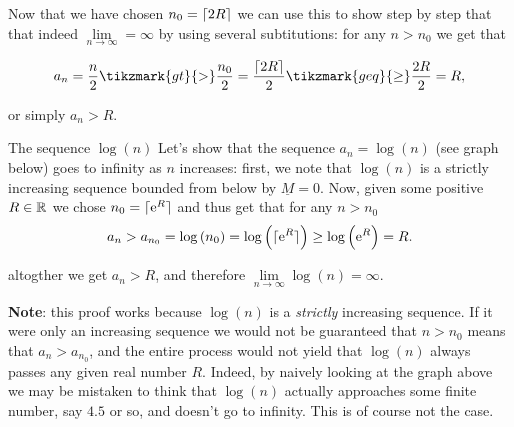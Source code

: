 Now that we have chosen $n_{0}=\lceil 2R \rceil$ we can use this to show step by step that that indeed $\lim\limits_{n\to\infty}=\infty$ by using several subtitutions: for any $n>n_{0}$ we get that

\vspace{1em}
\[
	a_{n} = \frac{n}{2} \tikzmark{gt}{>} \frac{n_{0}}{2} = \frac{\ceil{2R}}{2} \tikzmark{geq}{\geq}\frac{2R}{2} = R,
\]

\vspace{2em}
or simply $a_{n}>R$.

\vspace{2em}
\begin{example}{The sequence $\log(n)$}{}
	Let's show that the sequence $a_{n}=\log(n)$ (see graph below) goes to infinity as $n$ increases: first, we note that $\log(n)$ is a strictly increasing sequence bounded from below by $\underline{M}=0$. Now, given some positive $R\in\mathbb{R}^{}$ we chose $n_{0}=\lceil \mathrm{e}^{R} \rceil$ and thus get that for any $n>n_{0}$
	\[
		a_{n} > a_{n_{0}} = \log\left(n_{0}\right) = \log\left(\lceil \mathrm{e}^{R} \rceil\right) \geq \log\left(\mathrm{e}^{R}\right) = R.
	\]

	altogther we get $a_{n}>R$, and therefore $\lim\limits_{n\to\infty}\log(n)=\infty$.

	\vspace{2em}
	\begin{center}
	\end{center}

	\textbf{Note}: this proof works because $\log(n)$ is a \textit{strictly} increasing sequence. If it were only an increasing sequence we would not be guaranteed that $n>n_{0}$ means that $a_{n}>a_{n_{0}}$, and the entire process would not yield that $\log(n)$ always passes any given real number $R$. Indeed, by naively looking at the graph above we may be mistaken to think that $\log(n)$ actually approaches some finite number, say $4.5$ or so, and doesn't go to infinity. This is of course not the case.
\end{example}

